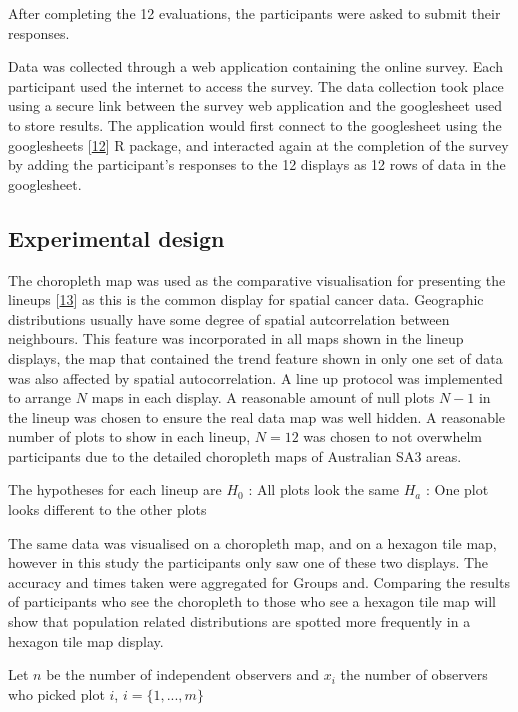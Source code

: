 \documentclass[conference,final,]{IEEEtran}
\begin{document}
After completing the 12 evaluations, the participants were asked to submit their responses.

Data was collected through a web application containing the online survey.
Each participant used the internet to access the survey.
The data collection took place using a secure link between the survey web application and the googlesheet used to store results. The application would first connect to the googlesheet using the googlesheets {[}\protect\hyperlink{ref-sheets}{12}{]} R package, and interacted again at the completion of the survey by adding the participant's responses to the 12 displays as 12 rows of data in the googlesheet.

\hypertarget{experimental-design}{%
\subsection{Experimental design}\label{experimental-design}}

The choropleth map was used as the comparative visualisation for presenting the lineups {[}\protect\hyperlink{ref-VVSIALM}{13}{]} as this is the common display for spatial cancer data.
Geographic distributions usually have some degree of spatial autcorrelation between neighbours.
This feature was incorporated in all maps shown in the lineup displays, the map that contained the trend feature shown in only one set of data was also affected by spatial autocorrelation.
A line up protocol was implemented to arrange \(N\) maps in each display.
A reasonable amount of null plots \(N-1\) in the lineup was chosen to ensure the real data map was well hidden. A reasonable number of plots to show in each lineup, \(N = 12\) was chosen to not overwhelm participants due to the detailed choropleth maps of Australian SA3 areas.

The hypotheses for each lineup are
\(H_0\) : All plots look the same
\(H_a\) : One plot looks different to the other plots

The same data was visualised on a choropleth map, and on a hexagon tile map, however in this study the participants only saw one of these two displays. The accuracy and times taken were aggregated for Groups and.
Comparing the results of participants who see the choropleth to those who see a hexagon tile map will show that population related distributions are spotted more frequently in a hexagon tile map display.

Let \(n\) be the number of independent observers and \(x_i\) the
number of observers who picked plot \(i\), \(i = \{1,...,m\}\)
\end{document}
